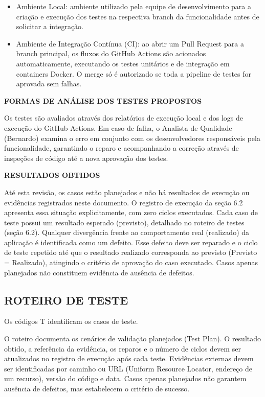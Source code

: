 \begin{itemize}
\item Ambiente Local: ambiente utilizado pela equipe de desenvolvimento para a criação e execução dos testes na respectiva branch da funcionalidade antes de solicitar a integração.

\item Ambiente de Integração Contínua (CI): ao abrir um Pull Request para a branch principal, os fluxos do GitHub Actions são acionados automaticamente, executando os testes unitários e de integração em containers Docker. O merge só é autorizado se toda a pipeline de testes for aprovada sem falhas.

\end{itemize}

\textbf{FORMAS DE ANÁLISE DOS TESTES PROPOSTOS}

Os testes são avaliados através dos relatórios de execução local e dos logs de execução do GitHub Actions. Em caso de falha, o Analista de Qualidade (Bernardo) examina o erro em conjunto com os desenvolvedores responsáveis pela funcionalidade, garantindo o reparo e acompanhando a correção através de inspeções de código até a nova aprovação dos testes.

\textbf{RESULTADOS OBTIDOS}

Até esta revisão, os casos estão planejados e não há resultados de execução ou evidências registrados neste documento. O registro de execução da seção 6.2 apresenta essa situação explicitamente, com zero ciclos executados. Cada caso de teste possui um resultado esperado (previsto), detalhado no roteiro de testes (seção 6.2). Qualquer divergência frente ao comportamento real (realizado) da aplicação é identificada como um defeito. Esse defeito deve ser reparado e o ciclo de teste repetido até que o resultado realizado corresponda ao previsto (Previsto = Realizado), atingindo o critério de aprovação do caso executado. Casos apenas planejados não constituem evidência de ausência de defeitos.

\subsection{ROTEIRO DE TESTE}

Os códigos T identificam os casos de teste.

O roteiro documenta os cenários de validação planejados (Test Plan). O resultado obtido, a referência da evidência, os reparos e o número de ciclos devem ser atualizados no registro de execução após cada teste. Evidências externas devem ser identificadas por caminho ou URL (Uniform Resource Locator, endereço de um recurso), versão do código e data. Casos apenas planejados não garantem ausência de defeitos, mas estabelecem o critério de sucesso.

